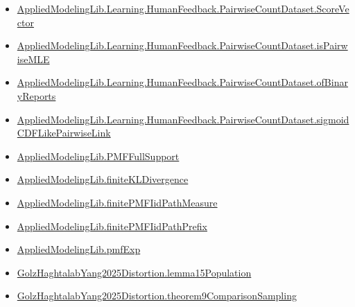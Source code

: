 \documentclass[10pt]{article}
\begin{document}
\begin{itemize}
\item \hyperlink{governing-declaration-87eda978eb1b0c9d}{Applied\allowbreak{}Modeling\allowbreak{}Lib.\allowbreak{}Learning.\allowbreak{}Human\allowbreak{}Feedback.\allowbreak{}Pairwise\allowbreak{}Count\allowbreak{}Dataset.\allowbreak{}Score\allowbreak{}Vector}
\item \hyperlink{governing-declaration-cba21d23e0e5aa10}{Applied\allowbreak{}Modeling\allowbreak{}Lib.\allowbreak{}Learning.\allowbreak{}Human\allowbreak{}Feedback.\allowbreak{}Pairwise\allowbreak{}Count\allowbreak{}Dataset.\allowbreak{}is\allowbreak{}Pairwise\allowbreak{}MLE}
\item \hyperlink{governing-declaration-449f87e91bf37ce0}{Applied\allowbreak{}Modeling\allowbreak{}Lib.\allowbreak{}Learning.\allowbreak{}Human\allowbreak{}Feedback.\allowbreak{}Pairwise\allowbreak{}Count\allowbreak{}Dataset.\allowbreak{}of\allowbreak{}Binary\allowbreak{}Reports}
\item \hyperlink{governing-declaration-ed6af38b0210f5ec}{Applied\allowbreak{}Modeling\allowbreak{}Lib.\allowbreak{}Learning.\allowbreak{}Human\allowbreak{}Feedback.\allowbreak{}Pairwise\allowbreak{}Count\allowbreak{}Dataset.\allowbreak{}sigmoid\allowbreak{}CDF\allowbreak{}Like\allowbreak{}Pairwise\allowbreak{}Link}
\item \hyperlink{library-prerequisite-268c959ee7d2d148}{Applied\allowbreak{}Modeling\allowbreak{}Lib.\allowbreak{}PMF\allowbreak{}Full\allowbreak{}Support}
\item \hyperlink{library-prerequisite-d3573881ae45d4c6}{Applied\allowbreak{}Modeling\allowbreak{}Lib.\allowbreak{}finite\allowbreak{}KL\allowbreak{}Divergence}
\item \hyperlink{governing-declaration-779fe1555fbbcea5}{Applied\allowbreak{}Modeling\allowbreak{}Lib.\allowbreak{}finite\allowbreak{}PMF\allowbreak{}Iid\allowbreak{}Path\allowbreak{}Measure}
\item \hyperlink{governing-declaration-89219e02ea5145c7}{Applied\allowbreak{}Modeling\allowbreak{}Lib.\allowbreak{}finite\allowbreak{}PMF\allowbreak{}Iid\allowbreak{}Path\allowbreak{}Prefix}
\item \hyperlink{governing-declaration-8e4b4389a4f6454b}{Applied\allowbreak{}Modeling\allowbreak{}Lib.\allowbreak{}pmf\allowbreak{}Exp}
\item \hyperlink{governing-declaration-877274851b50572c}{Golz\allowbreak{}Haghtalab\allowbreak{}Yang2025\allowbreak{}Distortion.\allowbreak{}lemma15\allowbreak{}Population}
\item \hyperlink{governing-declaration-9f5c608cbac97312}{Golz\allowbreak{}Haghtalab\allowbreak{}Yang2025\allowbreak{}Distortion.\allowbreak{}theorem9\allowbreak{}Comparison\allowbreak{}Sampling}

\end{itemize}
\end{document}
